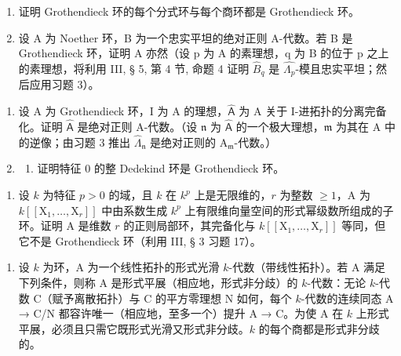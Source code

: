 \begin{enumerate}
\def\labelenumi{\alph{enumi})}
\item
  证明 Grothendieck 环的每个分式环与每个商环都是 Grothendieck 环。
\item
  设 A 为 Noether 环，B 为一个忠实平坦的绝对正则 A-代数。若 B 是 Grothendieck 环，证明 A 亦然（设 p 为 A 的素理想，q 为 B 的位于 p 之上的素理想，将利用 III, § 5, 第 4 节, 命题 4 证明 \(\widehat{B}_{q}\) 是 \(\widehat{\Lambda_{p}}\)-模且忠实平坦；然后应用习题 3）。
\end{enumerate}

\begin{enumerate}
\def\labelenumi{\arabic{enumi})}
\setcounter{enumi}{5}
\item
  设 A 为 Grothendieck 环，I 为 A 的理想，\(\widehat{\mathsf{A}}\) 为 A 关于 I-进拓扑的分离完备化。证明 \(\widehat{\mathsf{A}}\) 是绝对正则 A-代数。（设 \(\mathfrak{n}\) 为 \(\widehat{\mathsf{A}}\) 的一个极大理想，\(\mathfrak{m}\) 为其在 A 中的逆像；由习题 3 推出 \(\widehat{\Lambda}_{\mathfrak{n}}\) 是绝对正则的 \(\mathrm{A}_{\mathfrak{m}}\)-代数。）
\item
  \begin{enumerate}
  \def\labelenumii{\alph{enumii})}
  \tightlist
  \item
    证明特征 0 的整 Dedekind 环是 Grothendieck 环。
  \end{enumerate}
\end{enumerate}

\begin{enumerate}
\def\labelenumi{\alph{enumi})}
\setcounter{enumi}{1}
\tightlist
\item
  设 \(k\) 为特征 \(p > 0\) 的域，且 \(k\) 在 \(k^p\) 上是无限维的，\(r\) 为整数 \(\geqslant 1\)，A 为 \(k[[\mathrm{X}_1, \ldots, \mathrm{X}_r]]\) 中由系数生成 \(k^p\) 上有限维向量空间的形式幂级数所组成的子环。证明 A 是维数 \(r\) 的正则局部环，其完备化与 \(k[[\mathrm{X}_1, \ldots, \mathrm{X}_r]]\) 等同，但它不是 Grothendieck 环（利用 III, § 3 习题 17）。
\end{enumerate}


\begin{enumerate}
\def\labelenumi{\arabic{enumi})}
\tightlist
\item
  设 \(k\) 为环，A 为一个线性拓扑的形式光滑 \(k\)-代数（带线性拓扑）。若 A 满足下列条件，则称 A 是形式平展（相应地，形式非分歧）的 \(k\)-代数：无论 \(k\)-代数 C（赋予离散拓扑）与 C 的平方零理想 N 如何，每个 \(k\)-代数的连续同态 A → C/N 都容许唯一（相应地，至多一个）提升 A → C。为使 A 在 \(k\) 上形式平展，必须且只需它既形式光滑又形式非分歧。\(k\) 的每个商都是形式非分歧的。
\end{enumerate}

